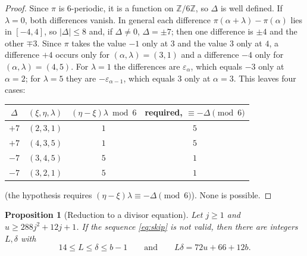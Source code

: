 \documentclass[11pt]{amsart}
\newtheorem{proposition}[theorem]{Proposition}
\theoremstyle{remark}
\newcommand{\Z}{\mathbb{Z}}
\begin{document}
\begin{proof}
Since $\pi$ is $6$-periodic, it is a function on $\Z/6\Z$, so $\Delta$ is well defined. If $\lambda=0$, both differences vanish. In general
each difference $\pi(\alpha+\lambda)-\pi(\alpha)$ lies in $[-4,4]$, so $|\Delta|\le8$ and, if $\Delta\neq0$, $\Delta=\pm7$; then one
difference is $\pm4$ and the other $\mp3$. Since $\pi$ takes the value $-1$ only at $3$ and the value $3$ only at $4$, a difference $+4$
occurs only for $(\alpha,\lambda)=(3,1)$ and a difference $-4$ only for $(\alpha,\lambda)=(4,5)$. For $\lambda=1$ the differences are
$\varepsilon_\alpha$, which equals $-3$ only at $\alpha=2$; for $\lambda=5$ they are $-\varepsilon_{\alpha-1}$, which equals $3$ only at
$\alpha=3$. This leaves four cases:
\begin{center}
\small
\begin{tabular}{@{}cccc@{}}
\toprule
$\Delta$ & $(\xi,\eta,\lambda)$ & $(\eta-\xi)\lambda\bmod 6$ & required, $\equiv-\Delta\pmod 6$ \\
\midrule
$+7$ & $(2,3,1)$ & $1$ & $5$\\
$+7$ & $(4,3,5)$ & $1$ & $5$\\
$-7$ & $(3,4,5)$ & $5$ & $1$\\
$-7$ & $(3,2,1)$ & $5$ & $1$\\
\bottomrule
\end{tabular}
\end{center}
(the hypothesis requires $(\eta-\xi)\lambda\equiv-\Delta\pmod 6$). None is possible.
\end{proof}

\begin{proposition}[Reduction to a divisor equation]\label{prop:reduction}
Let $j\ge1$ and $u\ge288j^2+12j+1$. If the sequence \eqref{eq:skip} is not valid, then there are integers $L,\delta$ with
\[
  14\le L\le\delta\le b-1\qquad\text{and}\qquad L\delta=72u+66+12b .
\]
\end{proposition}
\end{document}
